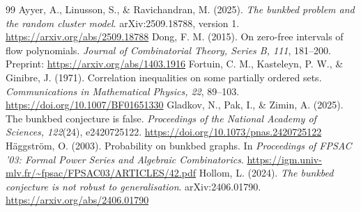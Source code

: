 \documentclass[11pt,a4paper]{article}
\theoremstyle{remark}\newtheorem{remark}[theorem]{Remark}
\begin{document}
\clearpage
\begin{thebibliography}{99}
 Ayyer, A., Linusson, S., \& Ravichandran, M. (2025).
\emph{The bunkbed problem and the random cluster model}. arXiv:2509.18788, version 1.
\url{https://arxiv.org/abs/2509.18788}
 Dong, F. M. (2015). On zero-free intervals of flow polynomials.
\emph{Journal of Combinatorial Theory, Series B, 111}, 181--200.
Preprint: \url{https://arxiv.org/abs/1403.1916}
 Fortuin, C. M., Kasteleyn, P. W., \& Ginibre, J. (1971).
Correlation inequalities on some partially ordered sets.
\emph{Communications in Mathematical Physics, 22}, 89--103.
\url{https://doi.org/10.1007/BF01651330}
 Gladkov, N., Pak, I., \& Zimin, A. (2025).
The bunkbed conjecture is false.
\emph{Proceedings of the National Academy of Sciences, 122}(24), e2420725122.
\url{https://doi.org/10.1073/pnas.2420725122}
 H\"aggstr\"om, O. (2003).
Probability on bunkbed graphs. In \emph{Proceedings of FPSAC '03: Formal Power Series and Algebraic Combinatorics}.
\url{https://igm.univ-mlv.fr/~fpsac/FPSAC03/ARTICLES/42.pdf}
 Hollom, L. (2024).
\emph{The bunkbed conjecture is not robust to generalisation}. arXiv:2406.01790.
\url{https://arxiv.org/abs/2406.01790}
\end{thebibliography}
\end{document}
